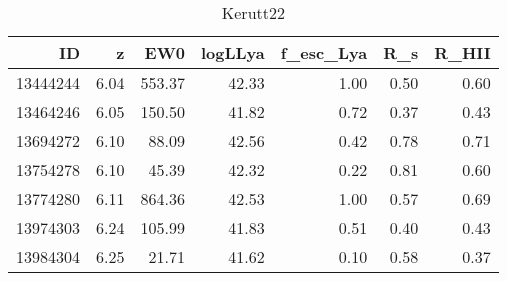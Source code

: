 \begin{table}[H]
\caption{Kerutt22}
\label{Kerutt22}
\begin{tabular}{rrrrrrr}
\toprule
ID & z & EW0 & logLLya & f_esc_Lya & R_s & R_HII \\
\midrule
13444244 & 6.04 & 553.37 & 42.33 & 1.00 & 0.50 & 0.60 \\
13464246 & 6.05 & 150.50 & 41.82 & 0.72 & 0.37 & 0.43 \\
13694272 & 6.10 & 88.09 & 42.56 & 0.42 & 0.78 & 0.71 \\
13754278 & 6.10 & 45.39 & 42.32 & 0.22 & 0.81 & 0.60 \\
13774280 & 6.11 & 864.36 & 42.53 & 1.00 & 0.57 & 0.69 \\
13974303 & 6.24 & 105.99 & 41.83 & 0.51 & 0.40 & 0.43 \\
13984304 & 6.25 & 21.71 & 41.62 & 0.10 & 0.58 & 0.37 \\
\bottomrule
\end{tabular}
\end{table}
